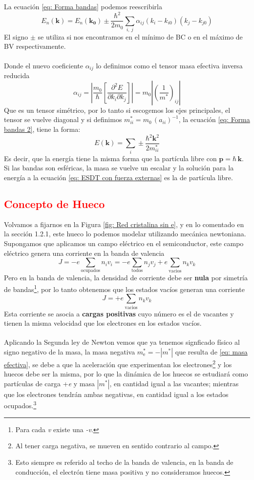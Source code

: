 La ecuación \ref{eq: Forma bandas} podemos reescribirla 
\begin{equation}
	E_n(\mathbf{k})=	E_n(\mathbf{k_0})\pm\frac{\hbar^2}{2m_0} \sum_{i, \ j} \alpha_{ij} (k_i-k_{i0})(k_j-k_{j0}) 
 \label{eq: Forma bandas 2}
\end{equation}
El signo $\pm$ se utiliza si nos encontramos en el mínimo de BC o en el máximo de BV respectivamente.\\\\
Donde el nuevo coeficiente $\alpha_{ij}$ lo definimos como el tensor masa efectiva inversa reducida$$\alpha_{ij}=\left |\frac{m_0}{\hbar} \left[  \frac{\partial ^2 E}{\partial k_i \partial k_j}\right]\right|= m_0 \left|\left(\frac{1}{m^*}\right)_{ij}\right| $$
Que es un tensor simétrico, por lo tanto si escogemos los ejes principales, el tensor se vuelve diagonal y si definimos $m_{ii}^*=m_0\, (a_{ii})^{-1}$, la ecuación \ref{eq: Forma bandas 2}, tiene la forma:
\begin{equation}
    E(\mathbf{k})=\sum_i \pm \frac{\hbar^2 \mathbf{k}^2}{2m_{ii}^*}
\end{equation}
Es decir, que la energía tiene la misma forma que la partícula libre con $\mathbf{p}=\hbar\, \mathbf{k}$. Si las bandas son esféricas, la masa se vuelve un escalar y la solución para la energía a la ecuación \ref{eq: ESDT con fuerza externas} es la de partícula libre.
\newpage
\subsection{\textcolor{red}{Concepto de Hueco}} \label{sec: Concepto de Hueco}
Volvamos a fijarnos en la Figura \ref{fig: Red cristalina sin e}, y en lo comentado en la sección 1.2.1, este hueco lo podemos modelar utilizando mecánica newtoniana. Supongamos que aplicamos un campo eléctrico en el semiconductor, este campo eléctrico genera una corriente en la banda de valencia $$J=-e \sum_{\mathrm{ocupados}} n_iv_i=-e\sum_{\mathrm{todos}} n_j v_j +e\sum_{\mathrm{vacios}} n_k v_k$$ Pero en la banda de valencia, la densidad de corriente debe ser \textbf{nula} por simetría de bandas\footnote{Para cada \textit{v} existe una \textit{-v}.}, por lo tanto obtenemos que los estados vacíos generan una corriente $$J=+e\sum_{\mathrm{vacios}} n_k v_k$$ Esta corriente se asocia a \textbf{cargas positivas} cuyo número es el de vacantes y tienen la misma velocidad que los electrones en los estados vacíos.\\\\
Aplicando la Segunda ley de Newton  vemos que ya tenemos signficado físico al signo negativo de la masa, la masa negativa $m_\mathrm{e}^*=-|m^*|$ que resulta de \ref{eq: masa efectiva}, se debe a que la aceleración que experimentan los electrones\footnote{Al tener carga negativa, se mueven en sentido contrario al campo.} y los huecos debe ser la misma, por lo que la dinámica de los huecos se estudiará como partículas de carga +\textit{e} y masa $|m^*|$, en cantidad igual a las vacantes; mientras que los electrones tendrán ambas negativas, en cantidad igual a los estados ocupados.\footnote{Esto siempre es referido al techo de la banda de valencia, en la banda de conducción, el electrón tiene masa positiva y no consideramos huecos.}


